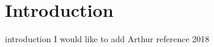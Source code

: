\chapter{Introduction}
introduction \citep{Oth2017}
I would like to add Arthur reference 2018
\lipsum[1-3]

